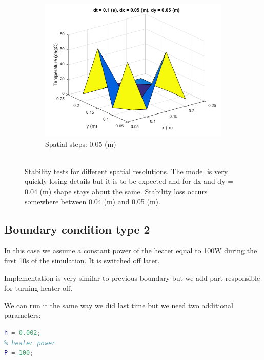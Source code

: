 \documentclass[12pt]{article}
\begin{document}
\begin{figure}[H]
\begin{subfigure}[b]{0.475\textwidth}
		\includegraphics[width=\textwidth]{s0505}
		{{\small Spatial steps: 0.05 (m)}}    
	\end{subfigure}
	\quad
	\begin{subfigure}[b]{0.475\textwidth}    
	\end{subfigure}
	{\small \\ Stability tests for different spatial resolutions. The model is very quickly losing details but it is to be expected and for dx and dy = 0.04 (m) shape stays about the same. Stability loss occurs somewhere between 0.04 (m) and 0.05 (m).} 
\end{figure}

\subsection{Boundary condition type 2}
In this case we assume a constant power of the heater equal to 100W during the first 10s of the simulation. It is switched off later.

Implementation is very similar to previous boundary but we add part responsible for turning heater off.



We can run it the same way we did last time but we need two additional parameters:

\begin{lstlisting}[language=Matlab, caption = {Additional parameters for boundary condition of type 2}, frame=single]
% plate thickness
h = 0.002;
% heater power 
P = 100;
\end{lstlisting}
\end{document}
